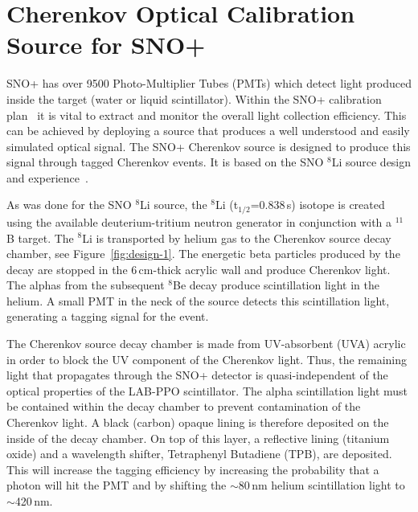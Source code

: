 \newcommand{\Li}{$^{8}$Li }
\renewcommand{\bf}{\bfseries}

\chapter{Cherenkov Optical Calibration Source for SNO+}
\label{ch:chsrc}

\label{chap:execsummary}

SNO+ has over 9500 Photo-Multiplier Tubes (PMTs) which detect light produced inside the target (water or liquid scintillator). Within the SNO+ calibration plan~\cite{gann:2013} it is vital to extract and monitor the overall light collection efficiency. This can be achieved by deploying a source that produces a well understood and easily simulated optical signal. The SNO+ Cherenkov source is designed to produce this signal through tagged Cherenkov events. It is based on the SNO \Li source design and experience~\cite{Tagg:2002,Tagg:2001}.


As was done for the SNO \Li source, the \Li (t$_{1/2}$=0.838\,s) isotope is created using the available deuterium-tritium neutron generator in conjunction with a $^{11}$B target. The \Li is transported by helium gas to the Cherenkov source decay chamber, see Figure~\ref{fig:design-1}. The energetic beta particles produced by the decay are stopped in the 6\,cm-thick acrylic wall and produce Cherenkov light. The alphas from the subsequent $^{8}$Be decay produce scintillation light in the helium. A small PMT in the neck of the source detects this scintillation light, generating a tagging signal for the event. 

The Cherenkov source decay chamber is made from UV-absorbent (UVA) acrylic in order to block the UV component of the Cherenkov light. Thus, the remaining light that propagates through the SNO+ detector is quasi-independent of the optical properties of the LAB-PPO scintillator. The alpha scintillation light must be contained within the decay chamber to prevent contamination of the Cherenkov light. A black (carbon) opaque lining is therefore deposited on the inside of the decay chamber. On top of this layer, a reflective lining (titanium oxide) and a wavelength shifter, Tetraphenyl Butadiene (TPB), are deposited. This will increase the tagging efficiency by increasing the probability that a photon will hit the PMT and by shifting the  $\sim$80\,nm helium scintillation light to $\sim$420\,nm.

